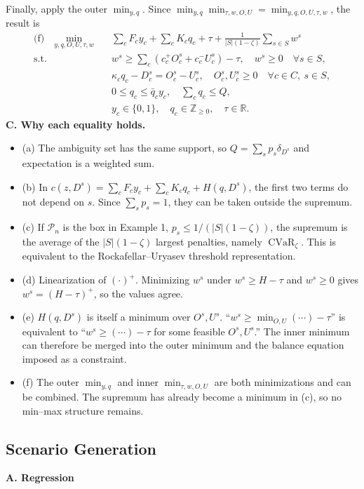 \documentclass[10pt,a4paper]{article}
\newcommand{\fixedcosts}{\sum_c F_cy_c+\sum_c K_cq_c}
\begin{document}
Finally, apply the outer $\min_{y,q}$. Since $\min_{y,q}\min_{\tau,w,O,U}=\min_{y,q,O,U,\tau,w}$, the result is
\[
\begin{aligned}
\text{(f)}\quad\min_{y,q,O,U,\tau,w}\quad&\fixedcosts+\tau+\frac1{|S|(1-\zeta)}\sum_{s\in S}w^s\\
\text{s.t.}\quad&w^s\ge\sum_c(c_c^+O_c^s+c_c^-U_c^s)-\tau,\quad w^s\ge0\quad\forall s\in S,\\
&\kappa_cq_c-D_c^s=O_c^s-U_c^s,\quad O_c^s,U_c^s\ge0\quad\forall c\in C,\ s\in S,\\
&0\le q_c\le\bar q_cy_c,\quad\sum_cq_c\le Q,\\
&y_c\in\{0,1\},\quad q_c\in\mathbb Z_{\ge0},\quad\tau\in\mathbb R.
\end{aligned}
\]
\textbf{C. Why each equality holds.}
\begin{itemize}
\item (a) The ambiguity set has the same support, so $Q=\sum_sp_s\delta_{D^s}$ and expectation is a weighted sum.
\item (b) In $c(z,D^s)=\sum_cF_cy_c+\sum_cK_cq_c+H(q,D^s)$, the first two terms do not depend on $s$. Since $\sum_sp_s=1$, they can be taken outside the supremum.
\item (c) If $\mathcal P_n$ is the box in Example 1, $p_s\le1/(|S|(1-\zeta))$, the supremum is the average of the $|S|(1-\zeta)$ largest penalties, namely $\operatorname{CVaR}_\zeta$. This is equivalent to the Rockafellar--Uryasev threshold representation.
\item (d) Linearization of $(\cdot)^+$. Minimizing $w^s$ under $w^s\ge H-\tau$ and $w^s\ge0$ gives $w^s=(H-\tau)^+$, so the values agree.
\item (e) $H(q,D^s)$ is itself a minimum over $O^s,U^s$. ``$w^s\ge\min_{O,U}(\cdots)-\tau$'' is equivalent to ``$w^s\ge(\cdots)-\tau$ for some feasible $O^s,U^s$.'' The inner minimum can therefore be merged into the outer minimum and the balance equation imposed as a constraint.
\item (f) The outer $\min_{y,q}$ and inner $\min_{\tau,w,O,U}$ are both minimizations and can be combined. The supremum has already become a minimum in (c), so no min--max structure remains.
\end{itemize}

\subsection{Scenario Generation}
\textbf{A. Regression}
\end{document}
